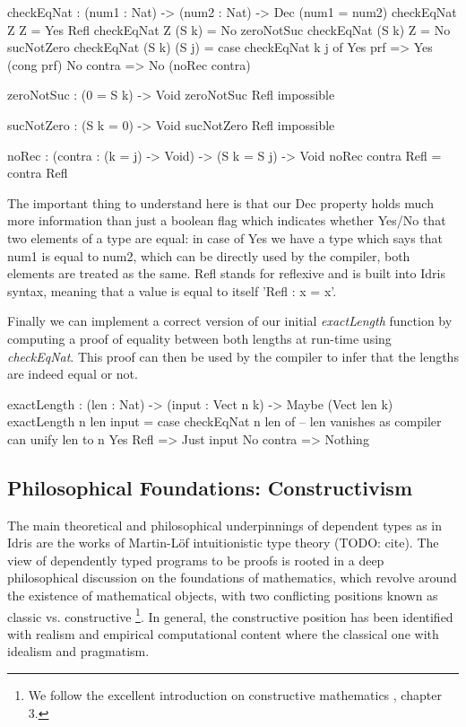 \begin{HaskellCode}
checkEqNat : (num1 : Nat) -> (num2 : Nat) -> Dec (num1 = num2)
checkEqNat Z Z         = Yes Refl
checkEqNat Z (S k)     = No zeroNotSuc
checkEqNat (S k) Z     = No sucNotZero
checkEqNat (S k) (S j) = case checkEqNat k j of
                              Yes prf   => Yes (cong prf)
                              No contra => No (noRec contra)
                              
zeroNotSuc : (0 = S k) -> Void
zeroNotSuc Refl impossible

sucNotZero : (S k = 0) -> Void
sucNotZero Refl impossible

noRec : (contra : (k = j) -> Void) -> (S k = S j) -> Void
noRec contra Refl = contra Refl
\end{HaskellCode}  
                            

The important thing to understand here is that our Dec property holds much more information than just a boolean flag which indicates whether Yes/No that two elements of a type are equal: in case of Yes we have a type which says that num1 is equal to num2, which can be directly used by the compiler, both elements are treated as the same. Refl stands for reflexive and is built into Idris syntax, meaning that a value is equal to itself 'Refl : x = x'. %

Finally we can implement a correct version of our initial \textit{exactLength} function by computing a proof of equality between both lengths at run-time using \textit{checkEqNat}. This proof can then be used by the compiler to infer that the lengths are indeed equal or not.

\begin{HaskellCode}
exactLength : (len : Nat) -> (input : Vect n k) -> Maybe (Vect len k)
exactLength {n} len input = case checkEqNat n len of
                                 -- len vanishes as compiler can unify len to n
                                 Yes Refl  => Just input 
                                 No contra => Nothing
\end{HaskellCode} 

\subsection{Philosophical Foundations: Constructivism}
\label{sub:dep_foundations}

The main theoretical and philosophical underpinnings of dependent types as in Idris are the works of Martin-Löf intuitionistic type theory (TODO: cite). The view of dependently typed programs to be proofs is rooted in a deep philosophical discussion on the foundations of mathematics, which revolve around the existence of mathematical objects, with two conflicting positions known as classic vs. constructive \footnote{We follow the excellent introduction on constructive mathematics \cite{thompson_type_1991}, chapter 3.}. In general, the constructive position has been identified with realism and empirical computational content where the classical one with idealism and pragmatism.

